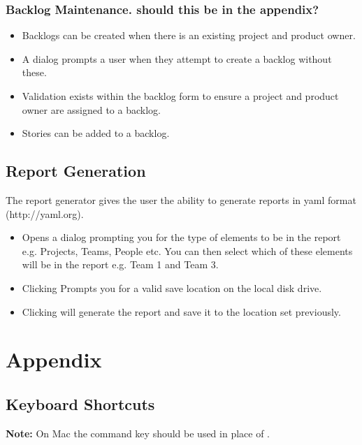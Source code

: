 \documentclass[11pt,fleqn]{book} %
\begin{document}
\subsection{Backlog Maintenance. should this be in the appendix?}
\begin{itemize}
\item Backlogs can be created when there is an existing project and product owner.
\item A dialog prompts a user when they attempt to create a backlog without these.
\item Validation exists within the backlog form to ensure a project and product owner are assigned to a backlog.
\item Stories can be added to a backlog.
\end{itemize}



\section{Report Generation}
The report generator gives the user the ability to generate reports in yaml format (http://yaml.org).
\begin{itemize}
  \item {} Opens a dialog prompting you for the type of elements to be in the report
  e.g. Projects, Teams, People etc. You can then select which of these elements will be in the report e.g. Team 1 and
  Team 3.
  \item Clicking  Prompts you for a valid save location on the local disk drive.
  \item Clicking  will generate the report and save it to the location set previously.
\end{itemize}


\appendix
\chapter{Appendix}

\section{Keyboard Shortcuts}

\textbf{Note:} On Mac the command key \keys{\cmd} should be used
  in place of \keys{\ctrl}.
\end{document}
